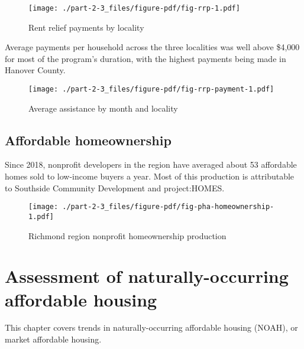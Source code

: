 \documentclass[
  letterpaper,
  DIV=11,
  numbers=noendperiod]{scrreprt}
\begin{document}
\begin{figure}

{\centering \texttt{[image: ./part-2-3\_files/figure-pdf/fig-rrp-1.pdf]}

}

\caption{\label{fig-rrp}Rent relief payments by locality}

\end{figure}

Average payments per household across the three localities was well
above \$4,000 for most of the program's duration, with the highest
payments being made in Hanover County.

\begin{figure}

{\centering \texttt{[image: ./part-2-3\_files/figure-pdf/fig-rrp-payment-1.pdf]}

}

\caption{\label{fig-rrp-payment}Average assistance by month and
locality}

\end{figure}

\hypertarget{affordable-homeownership}{%
\section{Affordable homeownership}\label{affordable-homeownership}}

Since 2018, nonprofit developers in the region have averaged about 53
affordable homes sold to low-income buyers a year. Most of this
production is attributable to Southside Community Development and
project:HOMES.

\begin{figure}

{\centering \texttt{[image: ./part-2-3\_files/figure-pdf/fig-pha-homeownership-1.pdf]}

}

\caption{\label{fig-pha-homeownership}Richmond region nonprofit
homeownership production}

\end{figure}

\hypertarget{part-2-4}{%
\chapter{Assessment of naturally-occurring affordable
housing}\label{part-2-4}}

This chapter covers trends in naturally-occurring affordable housing
(NOAH), or market affordable housing.
\end{document}
